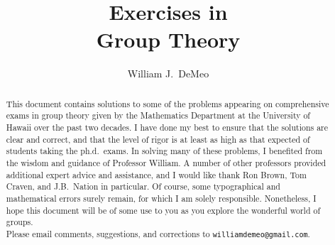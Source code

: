 \documentclass[wjd,wjdthms,boldvectors]{wjdarticle}
\title{{\large Exercises in}\\
{\sc Group Theory}}
\author{William J.~DeMeo}
\begin{document}
\maketitle
\begin{abstract}
\begin{center}
This document contains solutions to some of the problems appearing on comprehensive
exams in group theory given by the Mathematics Department at the
University of Hawaii over the past two decades. I have done my best to ensure that
the solutions are clear and correct, and that the level of rigor is at least as high
as that expected of students taking the ph.d.~exams.
In solving many of these problems, I benefited from the wisdom and guidance
of Professor William. A number of other professors provided  additional expert advice
and assistance, and I would like thank Ron Brown, Tom Craven, and J.B.~Nation in
particular.   Of course, some typographical and mathematical errors surely remain,
for which I am solely responsible. Nonetheless, I hope this document  will be of some
use to you as you explore the wonderful world of groups.  \\  
Please email comments, suggestions, and corrections to \verb!williamdemeo@gmail.com!.  
\end{center}

\end{abstract}

\tableofcontents

\pagestyle{fancy}

\newpage

\end{document}
